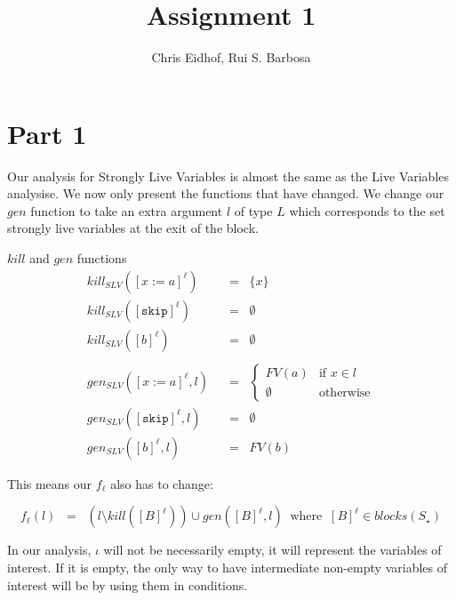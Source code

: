 \documentclass[a4wide,12pt]{article}
\def\skip{\texttt{skip}}
\def\eq{\;\; =  \;\;}
\begin{document}
\author{Chris Eidhof, Rui S. Barbosa}
\title{Assignment 1}

\maketitle

\section{Part 1}


Our analysis for Strongly Live Variables is almost the same as the Live
Variables analysise. We now only present the functions that have changed. We
change our $gen$ function to take an extra argument $l$ of type $L$ which
corresponds to the set strongly live variables at the exit of the block.

$kill$ and $gen$ functions
\begin{align*}
kill_{SLV}([x:=a]^\ell) &  \eq \{x\} \\
kill_{SLV}([\skip]^\ell) & \eq \emptyset\\
kill_{SLV}([b]^\ell) &  \eq \emptyset \\
\\
gen_{SLV}([x:=a]^\ell,l) & \eq
         \begin{cases}
          FV(a) & \text{if $x \in l$} \\
          \emptyset & \text{otherwise}
         \end{cases} \\
gen_{SLV}([\skip]^\ell,l) & \eq \emptyset\\
gen_{SLV}([b]^\ell,l) & \eq FV(b)
\end{align*}

This means our $f_\ell$ also has to change:

\[ f_\ell(l) \eq (l \setminus kill([B]^\ell)) \cup gen([B]^\ell, l) \;\; \text{where} \;\; [B]^\ell
\in blocks(S_\star)
\]

In our analysis, $\iota$ will not be necessarily empty, it will represent the
variables of interest. If it is empty, the only way to have intermediate
non-empty variables of interest will be by using them in conditions.
\end{document}
